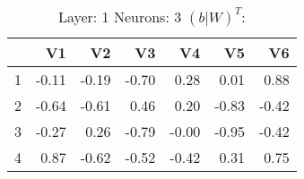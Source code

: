 \begin{table}[ht]
\centering
\begin{tabular}{rrrrrrr}
  \hline
 & V1 & V2 & V3 & V4 & V5 & V6 \\ 
  \hline
1 & -0.11 & -0.19 & -0.70 & 0.28 & 0.01 & 0.88 \\ 
  2 & -0.64 & -0.61 & 0.46 & 0.20 & -0.83 & -0.42 \\ 
  3 & -0.27 & 0.26 & -0.79 & -0.00 & -0.95 & -0.42 \\ 
  4 & 0.87 & -0.62 & -0.52 & -0.42 & 0.31 & 0.75 \\ 
   \hline
\end{tabular}
\caption{Layer: 1 Neurons: 3  $(b|W)^T$: 
} 
\end{table}
